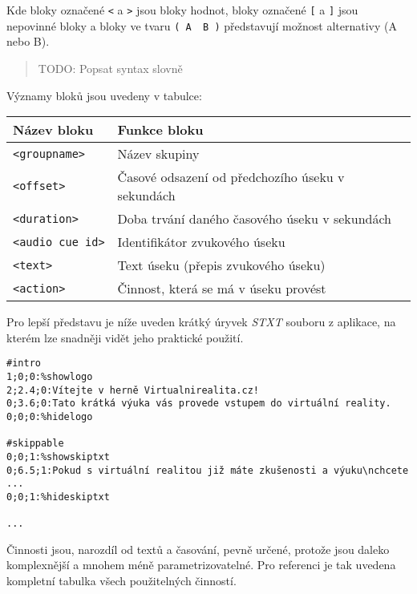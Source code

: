 Kde bloky označené \texttt{\textless{}} a \texttt{\textgreater{}} jsou
bloky hodnot, bloky označené \texttt{{[}} a \texttt{{]}} jsou nepovinné
bloky a bloky ve tvaru \texttt{(\ A\ \textbar{}\ B\ )} představují
možnost alternativy (A nebo B).

\begin{quote}
TODO: Popsat syntax slovně
\end{quote}

Významy bloků jsou uvedeny v tabulce:

\begin{longtable}[]{@{}ll@{}}
\toprule
Název bloku & Funkce bloku\tabularnewline
\midrule
\endhead
\texttt{\textless{}groupname\textgreater{}} & Název
skupiny\tabularnewline
\texttt{\textless{}offset\textgreater{}} & Časové odsazení od
předchozího úseku v sekundách\tabularnewline
\texttt{\textless{}duration\textgreater{}} & Doba trvání daného časového
úseku v sekundách\tabularnewline
\texttt{\textless{}audio\ cue\ id\textgreater{}} & Identifikátor
zvukového úseku\tabularnewline
\texttt{\textless{}text\textgreater{}} & Text úseku (přepis zvukového
úseku)\tabularnewline
\texttt{\textless{}action\textgreater{}} & Činnost, která se má v úseku
provést\tabularnewline
\bottomrule
\end{longtable}

Pro lepší představu je níže uveden krátký úryvek \emph{STXT} souboru z
aplikace, na kterém lze snadněji vidět jeho praktické použití.

\begin{verbatim}
#intro
1;0;0:%showlogo
2;2.4;0:Vítejte v herně Virtualnirealita.cz!
0;3.6;0:Tato krátká výuka vás provede vstupem do virtuální reality.
0;0;0:%hidelogo

#skippable
0;0;1:%showskiptxt
0;6.5;1:Pokud s virtuální realitou již máte zkušenosti a výuku\nchcete ...
0;0;1:%hideskiptxt

...
\end{verbatim}

Činnosti jsou, narozdíl od textů a časování, pevně určené, protože jsou
daleko komplexnější a mnohem méně parametrizovatelné. Pro referenci je
tak uvedena kompletní tabulka všech použitelných činností.

